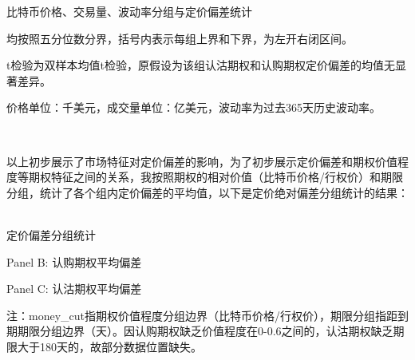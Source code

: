 \begin{center} 
    \begin{table}[H]
        \caption{比特币价格、交易量、波动率分组与定价偏差统计}
        \label{return_grouped_bias}
        \resizebox{\linewidth}{!}{}
        \smallskip
        \bigskip
        \resizebox{\linewidth}{!}{}
        \smallskip
        \bigskip
        \resizebox{\linewidth}{!}{}
        \smallskip
        \bigskip
        \resizebox{\linewidth}{!}{}
        \smallskip
        \begin{tablenotes}
            \footnotesize
            \item 均按照五分位数分界，括号内表示每组上界和下界，为左开右闭区间。
            \item t检验为双样本均值t检验，原假设为该组认沽期权和认购期权定价偏差的均值无显著差异。
            \item 价格单位：千美元，成交量单位：亿美元，波动率为过去365天历史波动率。
        \end{tablenotes}
    \end{table}
    
\end{center}
~\\
\par{以上初步展示了市场特征对定价偏差的影响，为了初步展示定价偏差和期权价值程度等期权特征之间的关系，我按照期权的相对价值（比特币价格/行权价）和期限分组，统计了各个组内定价偏差的平均值，以下是定价绝对偏差分组统计的结果：}
~\\
\begin{center}
\begin{threeparttable}[HT]
\centering
\caption{定价偏差分组统计}
\label{grouped}
\label{tab:option_bias_group}
\begin{small}


\bigskip

\caption*{Panel B: 认购期权平均偏差}
\bigskip

\caption*{Panel C: 认沽期权平均偏差}
\begin{tablenotes}
\footnotesize
\item 注：money\_cut指期权价值程度分组边界（比特币价格/行权价），期限分组指距到期期限分组边界（天）。因认购期权缺乏价值程度在0-0.6之间的，认沽期权缺乏期限大于180天的，故部分数据位置缺失。
\end{tablenotes}
\end{small}
\end{threeparttable}

\end{center}

